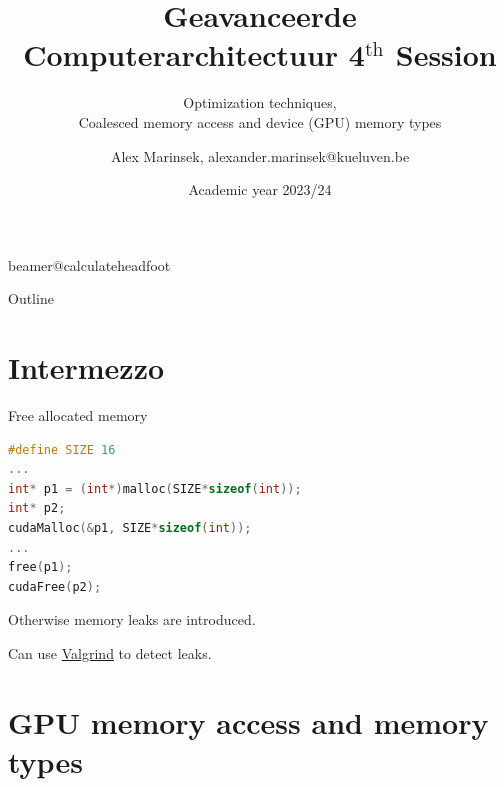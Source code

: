 \documentclass[11pt,t]{beamer}
\title[Geavanceerde Computerarchitectuur 4$^{\text{th}}$ Session]{Geavanceerde Computerarchitectuur 4$^{\text{th}}$ Session} %
\subtitle{Optimization techniques, \\ Coalesced memory access and device (GPU) memory types}
\author{Alex Marinsek, {\footnotesize alexander.marinsek@kueluven.be}}
\institute{DRAMCO -- WaveCore -- ESAT}
\date{Academic year 2023/24}
\begin{document}
\csname beamer@calculateheadfoot\endcsname %


\begin{frame}
	\titlepage
\end{frame}
	

\begin{frame}{Outline}
	\hfill	{\large \parbox{.961\textwidth}{\vspace{4mm}\tableofcontents[hideothersubsections]}}
\end{frame}



\section{Intermezzo}

\begin{frame}[fragile]{Free allocated memory}

\begin{lstlisting}[language=C++]
#define SIZE 16
...
int* p1 = (int*)malloc(SIZE*sizeof(int));
int* p2;
cudaMalloc(&p1, SIZE*sizeof(int));
...
free(p1);
cudaFree(p2);
\end{lstlisting}

\vspace{4mm}

Otherwise memory leaks are introduced.

\vspace{2mm}

Can use \href{https://valgrind.org/}{Valgrind} to detect leaks.
    
\end{frame}


\section{GPU memory access and memory types}
\end{document}
